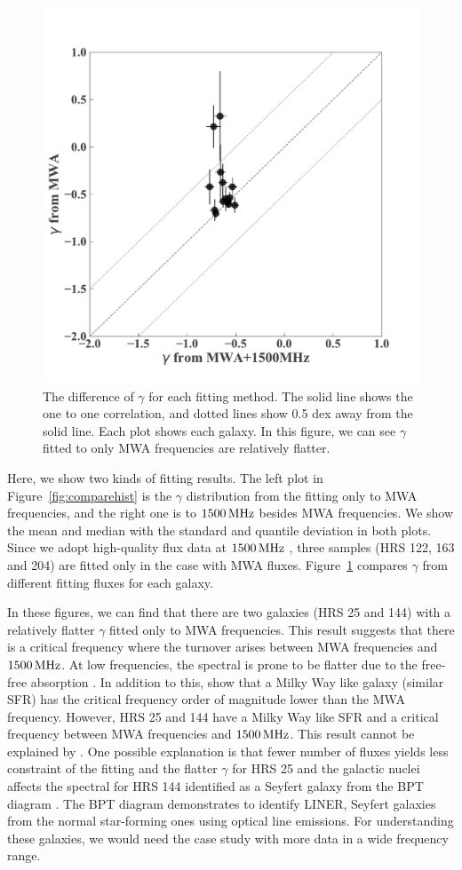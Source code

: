 \begin{figure}[htbp]
	\centering
	\includegraphics[width=.6\linewidth]{Chapter_5/Figures/Result_comparealpha.pdf}
    \caption[The comparison of $\gamma$ from different fitting methods]{\label{fig:comparegamma}
        The difference of $\gamma$ for each fitting method.
        The solid line shows the one to one correlation, and dotted lines show 0.5 dex away from the solid line.
        Each plot shows each galaxy.
        In this figure, we can see $\gamma$ fitted to only MWA frequencies are relatively flatter.
    }
\end{figure}

Here, we show two kinds of fitting results.
The left plot in Figure~\ref{fig:comparehist} is the $\gamma$ distribution from the fitting only to MWA frequencies, and the right one is to $1500\,\mathrm{MHz}$ besides MWA frequencies.
We show the mean and median with the standard and quantile deviation in both plots.
Since we adopt high-quality flux data at $1500\,\mathrm{MHz}$ \citep{Boselli2015}, three samples (HRS 122, 163 and 204) are fitted only in the case with MWA fluxes.
Figure~\ref{fig:comparegamma} compares $\gamma$ from different fitting fluxes for each galaxy.

In these figures, we can find that there are two galaxies (HRS 25 and 144) with a relatively flatter $\gamma$ fitted only to MWA frequencies.
This result suggests that there is a critical frequency where the turnover arises between MWA frequencies and $1500\,\mathrm{MHz}$.
At low frequencies, the spectral is prone to be flatter due to the free-free absorption \citep[e.g.,][]{CalistroRivera2017a, Schober2017, Chyzy2018}.
In addition to this, \citet{Schober2017} show that a Milky Way like galaxy (similar SFR) has the critical frequency order of magnitude lower than the MWA frequency.
However, HRS 25 and 144 have a Milky Way like SFR \citep{Boselli2015} and a critical frequency between MWA frequencies and $1500\,\mathrm{MHz}$.
This result cannot be explained by \citet{Schober2017}.
One possible explanation is that fewer number of fluxes yields less constraint of the fitting and the flatter $\gamma$ for HRS 25 and the galactic nuclei affects the spectral for HRS 144 identified as a Seyfert galaxy from the BPT diagram \citep[e.g.,][]{Baldwin1981, Kewley2001, Kauffmann2003, Schawinski2007}.
The BPT diagram demonstrates to identify LINER, Seyfert galaxies from the normal star-forming ones using optical line emissions.
For understanding these galaxies, we would need the case study with more data in a wide frequency range.

